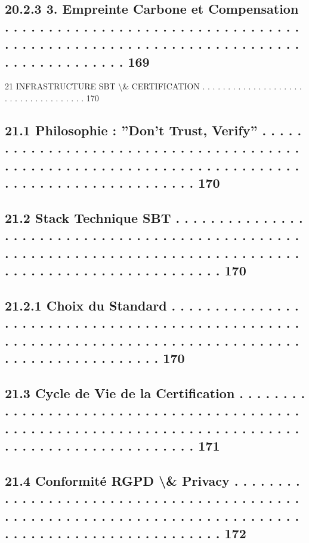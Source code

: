 \documentclass[12pt,landscape,a4paper]{article}
\begin{document}
\subsection{20.2.3             3. Empreinte Carbone et Compensation . . . . . . . . . . . . . . . . . . . . . . . . . . . . . . . . . . . . . . . . . . . . . . . . . . . . . . . . . . . . . . . . . . . . . . . . . . . . . . . . . . 169}
\vspace{0.5em}
21    INFRASTRUCTURE SBT \textbackslash{}& CERTIFICATION . . . . . . . . . . . . . . . . . . . . . . . . . . . . . . . . . . . . 170\\
\subsection{21.1    Philosophie : ”Don’t Trust, Verify” . . . . . . . . . . . . . . . . . . . . . . . . . . . . . . . . . . . . . . . . . . . . . . . . . . . . . . . . . . . . . . . . . . . . . . . . . . . . . . . . . . . . . . . . . . . . . . . 170}
\subsection{21.2    Stack Technique SBT . . . . . . . . . . . . . . . . . . . . . . . . . . . . . . . . . . . . . . . . . . . . . . . . . . . . . . . . . . . . . . . . . . . . . . . . . . . . . . . . . . . . . . . . . . . . . . . . . . . . . . . . . . . . 170}
\subsection{21.2.1             Choix du Standard . . . . . . . . . . . . . . . . . . . . . . . . . . . . . . . . . . . . . . . . . . . . . . . . . . . . . . . . . . . . . . . . . . . . . . . . . . . . . . . . . . . . . . . . . . . . . . . . . . . . . 170}
\subsection{21.3    Cycle de Vie de la Certification . . . . . . . . . . . . . . . . . . . . . . . . . . . . . . . . . . . . . . . . . . . . . . . . . . . . . . . . . . . . . . . . . . . . . . . . . . . . . . . . . . . . . . . . . . . . . . . . . . 171}
\subsection{21.4    Conformité RGPD \textbackslash{}& Privacy . . . . . . . . . . . . . . . . . . . . . . . . . . . . . . . . . . . . . . . . . . . . . . . . . . . . . . . . . . . . . . . . . . . . . . . . . . . . . . . . . . . . . . . . . . . . . . . . . . . . . 172}
\end{document}
